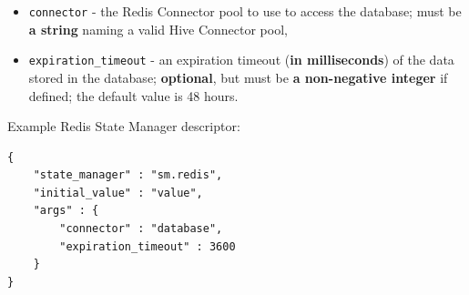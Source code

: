 \documentclass[a4paper]{article}
\begin{document}
\begin{itemize}
\item \texttt{connector} - the Redis Connector pool to use to access the database; must be \textbf{a string} naming a valid Hive Connector pool,
\item \texttt{expiration\_timeout} - an expiration timeout (\textbf{in milliseconds}) of the data stored in the database; \textbf{optional}, but must be \textbf{a non-negative integer} if defined; the default value is 48 hours.
\end{itemize}

\noindent
Example Redis State Manager descriptor:

\begin{verbatim}
{
    "state_manager" : "sm.redis",
    "initial_value" : "value",
    "args" : {
        "connector" : "database",
        "expiration_timeout" : 3600
    }
}
\end{verbatim}
\end{document}
